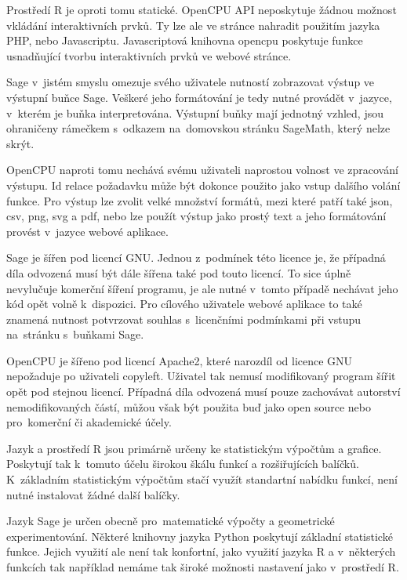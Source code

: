 \documentclass[thesis=B,czech]{FITthesis}[2012/06/26]
\begin{document}
Prostředí R je oproti tomu statické. OpenCPU API neposkytuje žádnou možnost vkládání interaktivních prvků. Ty lze ale ve stránce nahradit použitím jazyka PHP, nebo Javascriptu. Javascriptová knihovna opencpu poskytuje funkce usnadňující tvorbu interaktivních prvků ve webové stránce.

Sage v~jistém smyslu omezuje svého uživatele nutností zobrazovat výstup ve výstupní buňce Sage. Veškeré jeho formátování je tedy nutné provádět v~jazyce, v~kterém je buňka interpretována. Výstupní buňky mají jednotný vzhled, jsou ohraničeny rámečkem s~odkazem na~domovskou stránku SageMath, který nelze skrýt.

OpenCPU naproti tomu nechává svému uživateli naprostou volnost ve zpracování výstupu. Id relace požadavku může být dokonce použito jako vstup dalšího volání funkce. Pro výstup lze zvolit velké množství formátů, mezi které patří také json, csv, png, svg a pdf, nebo lze použít výstup jako prostý text a jeho formátování provést v~jazyce webové aplikace. 

Sage je šířen pod licencí GNU. Jednou z~podmínek této licence je, že případná díla odvozená musí být dále šířena také pod touto licencí. To sice úplně nevylučuje komerční šíření programu, je ale nutné v~tomto případě nechávat jeho kód opět volně k~dispozici. Pro cílového uživatele webové aplikace to také znamená nutnost potvrzovat souhlas s~licenčními podmínkami při vstupu na~stránku s~buňkami Sage.

OpenCPU je šířeno pod licencí Apache2, které narozdíl od licence GNU nepožaduje po uživateli copyleft. Uživatel tak nemusí modifikovaný program šířit opět pod stejnou licencí. Případná díla odvozená musí pouze zachovávat autorství nemodifikovaných částí, můžou však být použita buď jako open source nebo pro~komerční či akademické účely.

Jazyk a prostředí R jsou primárně určeny ke statistickým výpočtům a grafice. Poskytují tak k~tomuto účelu širokou škálu funkcí a rozšiřujících balíčků. K~základním statistickým výpočtům stačí využít standartní nabídku funkcí, není nutné instalovat žádné další balíčky.  

Jazyk Sage je určen obecně pro~matematické výpočty a geometrické experimentování. Některé knihovny jazyka Python poskytují základní statistické funkce. Jejich využití ale není tak konfortní, jako využití jazyka R a v~některých funkcích tak například nemáme tak široké možnosti nastavení jako v~prostředí R.
\end{document}
